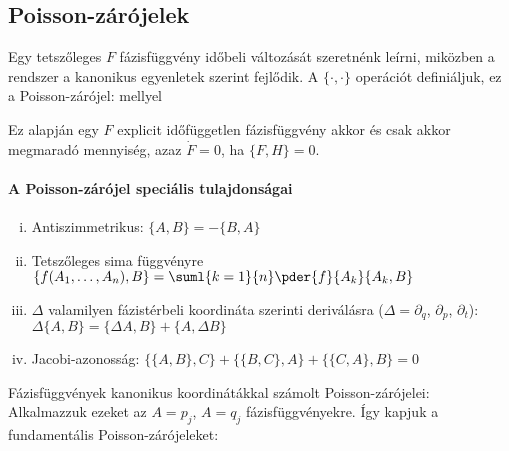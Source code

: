   \subsection{Poisson-zárójelek}
   
   Egy tetszőleges $F$ fázisfüggvény időbeli változását szeretnénk leírni, miközben a rendszer a kanonikus egyenletek szerint fejlődik.
   A $\{\cdot,\cdot\}$ operációt definiáljuk, ez a Poisson-zárójel:
   mellyel
   
   Ez alapján egy $F$ explicit időfüggetlen fázisfüggvény akkor és csak akkor megmaradó mennyiség, azaz $\dot{F}=0$, ha $\{F,H\}=0$.
   
   \paragraph{A Poisson-zárójel speciális tulajdonságai}
   \begin{enumerate}[i)]
    \item Antiszimmetrikus: $\{A,B\}=-\{B,A\}$
    \item Tetszőleges sima függvényre $\{f(A_1,\dots,A_n),B\}=\suml{k=1}{n}\pder{f}{A_k}\{A_k,B\}$
    \item $\Delta$ valamilyen fázistérbeli koordináta szerinti deriválásra ($\Delta =\partial_q$, $\partial_p$, $\partial_t$): $\Delta\{A,B\}=\{\Delta A,B\}+\{A,\Delta B\}$
    \item Jacobi-azonosság: $\{\{A,B\},C\}+\{\{B,C\},A\}+\{\{C,A\},B\}=0$
   \end{enumerate}
   
   Fázisfüggvények kanonikus koordinátákkal számolt Poisson-zárójelei:
   Alkalmazzuk ezeket az $A=p_j$, $A=q_j$ fázisfüggvényekre. Így kapjuk a fundamentális Poisson-zárójeleket:
   

